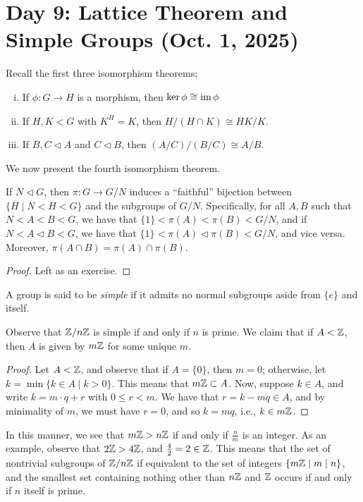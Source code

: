 \section{Day 9: Lattice Theorem and Simple Groups (Oct. 1, 2025)}
Recall the first three isomorphism theorems;
\begin{enumerate}[(i)]
    \item If $\phi : G \to H$ is a morphism, then $\ker \phi \cong \operatorname{im} \phi$
    \item If $H, K < G$ with $K^H = K$, then $H/(H \cap K) \cong HK/K$.
    \item If $B, C \lhd A$ and $C \lhd B$, then $(A/C) / (B/C) \cong A/B$.
\end{enumerate}
\noindent We now present the fourth isomorphism theorem.
\begin{theorem}
    If $N \lhd G$, then $\pi : G \to G/N$ induces a ``faithful'' bijection between $\{H \mid N < H < G\}$ and the subgroups of $G/N$. Specifically, for all $A, B$ such that $N < A < B < G$, we have that $\{1\} < \pi(A) < \pi(B) < G/N$, and if $N < A \lhd B < G$, we have that $\{1\} < \pi(A) \lhd \pi(B) < G/N$, and vice versa. Moreover, $\pi(A \cap B) = \pi(A) \cap \pi(B)$.
\end{theorem}
\begin{proof}
    Left as an exercise.
\end{proof}
\begin{definition}
    A group is said to be \textit{simple} if it admits no normal subgroups aside from $\{e\}$ and itself.
\end{definition}
\noindent Observe that $\mathbb Z/n\mathbb Z$ is simple if and only if $n$ is prime. We claim that if $A < \mathbb Z$, then $A$ is given by $m \mathbb Z$ for some unique $m$.
\begin{proof}
    Let $A < \mathbb Z$, and observe that if $A = \{0\}$, then $m = 0$; otherwise, let $k = \min\{k \in A \mid k > 0\}$. This means that $m\mathbb Z \subset A$. Now, suppose $k \in A$, and write $k = m \cdot q + r$ with $0 \leq r < m$. We have that $r = k - mq \in A$, and by minimality of $m$, we must have $r = 0$, and so $k = mq$, i.e., $k \in m\mathbb Z$. 
\end{proof}
\noindent In this manner, we see that $m\mathbb Z > n\mathbb Z$ if and only if $\frac{n}{m}$ is an integer. As an example, observe that $2 \mathbb Z > 4 \mathbb Z$, and $\frac{4}{2} = 2 \in \mathbb Z$. This means that the set of nontrivial subgroups of $\mathbb Z/n\mathbb Z$ if equivalent to the set of integers $\{m\mathbb Z \mid m \mid n\}$, and the smallest set containing nothing other than $n\mathbb Z$ and $\mathbb Z$ occurs if and only if $n$ itself is prime.
